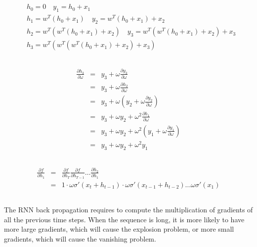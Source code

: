 \documentclass[12pt]{article}
\begin{document}
\subsection{}
\begin{align}
    &h_0 = 0 \quad y_1 = h_0 + x_1 \nonumber  \\
    &h_1 = w^T (h_0 + x_1) \quad  y_2 = w^T(h_0 + x_1) + x_2 \nonumber  \\
    &h_2 = w^T(w^T(h_0 + x_1) + x_2) \quad  y_3 = w^T(w^T(h_0 + x_1) + x_2) + x_3 \nonumber  \\
    &h_3 = w^T(w^T(w^T(h_0 + x_1) + x_2) + x_3) \quad \nonumber
\end{align}

\subsection{}
\begin{eqnarray}
    \frac{\partial h_3}{\partial \omega} &=& y_3 + \omega \frac{\partial y_3}{\partial\omega} \nonumber \\
    &=& y_3 + \omega \frac{\partial h_2}{\partial \omega} \nonumber \\
    &=& y_3 + \omega (y_2 + \omega \frac{\partial y_2}{\partial \omega}) \nonumber \\
    &=& y_3 + \omega y_2 + \omega^2 \frac{\partial h_1}{\partial \omega} \nonumber \\
    &=& y_3 + \omega y_2 + \omega^2 (y_1 + \omega \frac{\partial y_1}{\partial \omega}) \nonumber \\
    &=& y_3 + \omega y_2 + \omega^2 y_1 \nonumber
\end{eqnarray}

\subsection{}
\begin{eqnarray}
    \frac{\partial f}{\partial h_1} &=& \frac{\partial f}{\partial h_T} \frac{\partial f}{\partial h_{T-1}} \dots \frac{\partial h_2}{\partial h_1} \nonumber \\
    &=& 1 \cdot \omega \sigma'(x_t + h_{t-1}) \cdot \omega \sigma'(x_{t-1} + h_{t-2}) \dots \omega \sigma'(x_1) \nonumber 
\end{eqnarray}

\subsection{}
The RNN back propagation requires to compute the multiplication of gradients of all the previous time steps. When the sequence is long, it is more likely to have more large gradients, which will cause the explosion problem, or more small gradients, which will cause the vanishing problem.
\end{document}
